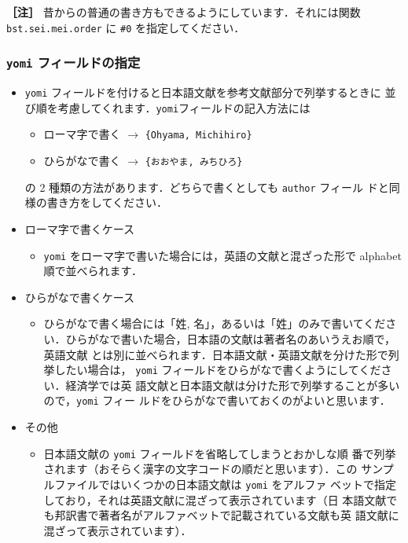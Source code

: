 \documentclass[article]{jlreq}
\newcommand{\midashii}[1]{\noindent \textbf{［#1］}}
\begin{document}
\midashii{注} 昔からの普通の書き方もできるようにしています．それには関数
\texttt{bst.sei.mei.order} に \verb|#0| を指定してください．


\subsubsection{\texttt{yomi} フィールドの指定}

\begin{itemize}
 \item \texttt{yomi} フィールドを付けると日本語文献を参考文献部分で列挙するときに
      並び順を考慮してくれます．\texttt{yomi}フィールドの記入方法には
       \begin{itemize}
        \item ローマ字で書く $\longrightarrow$ \verb|{Ohyama, Michihiro}|
        \item ひらがなで書く $\longrightarrow$ \verb|{おおやま, みちひろ}|
       \end{itemize}
       の 2 種類の方法があります．どちらで書くとしても \texttt{author} フィール
       ドと同様の書き方をしてください．
 \item ローマ字で書くケース
       \begin{itemize}
        \item \texttt{yomi} をローマ字で書いた場合には，英語の文献と混ざった形で
       alphabet 順で並べられます．
       \end{itemize}
 \item ひらがなで書くケース
       \begin{itemize}
        \item   ひらがなで書く場合には「姓, 名」，あるいは「姓」のみで書いてくださ
       い．ひらがなで書いた場合，日本語の文献は著者名のあいうえお順で，英語文献
       とは別に並べられます．日本語文献・英語文献を分けた形で列挙したい場合は，
       \texttt{yomi} フィールドをひらがなで書くようにしてください．経済学では英
       語文献と日本語文献は分けた形で列挙することが多いので，\texttt{yomi} フィー
       ルドをひらがなで書いておくのがよいと思います．
       \end{itemize}
 \item その他
       \begin{itemize}
        \item 日本語文献の \texttt{yomi} フィールドを省略してしまうとおかしな順
              番で列挙されます（おそらく漢字の文字コードの順だと思います）．この
              サンプルファイルではいくつかの日本語文献は \texttt{yomi} をアルファ
              ベットで指定しており，それは英語文献に混ざって表示されています（日
              本語文献でも邦訳書で著者名がアルファベットで記載されている文献も英
              語文献に混ざって表示されています）．
       \end{itemize}
\end{itemize}
\end{document}
